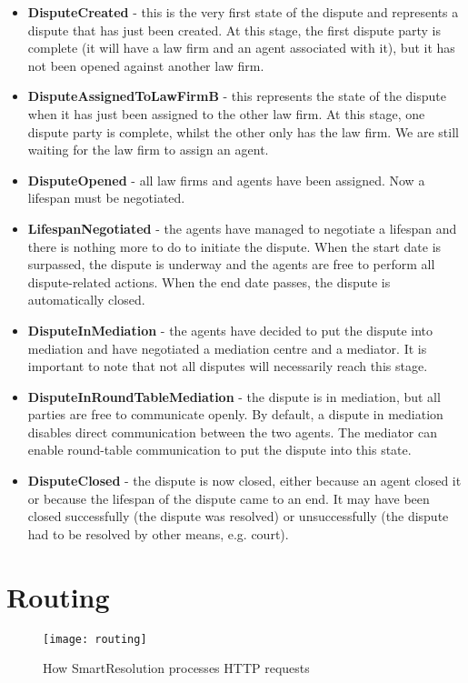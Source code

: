 \begin{itemize}
    \item \textbf{DisputeCreated} - this is the very first state of the dispute and represents a dispute that has just been created. At this stage, the first dispute party is complete (it will have a law firm and an agent associated with it), but it has not been opened against another law firm.
    \item \textbf{DisputeAssignedToLawFirmB} - this represents the state of the dispute when it has just been assigned to the other law firm. At this stage, one dispute party is complete, whilst the other only has the law firm. We are still waiting for the law firm to assign an agent.
    \item \textbf{DisputeOpened} - all law firms and agents have been assigned. Now a lifespan must be negotiated.
    \item \textbf{LifespanNegotiated} - the agents have managed to negotiate a lifespan and there is nothing more to do to initiate the dispute. When the start date is surpassed, the dispute is underway and the agents are free to perform all dispute-related actions. When the end date passes, the dispute is automatically closed.
    \item \textbf{DisputeInMediation} - the agents have decided to put the dispute into mediation and have negotiated a mediation centre and a mediator. It is important to note that not all disputes will necessarily reach this stage.
    \item \textbf{DisputeInRoundTableMediation} - the dispute is in mediation, but all parties are free to communicate openly. By default, a dispute in mediation disables direct communication between the two agents. The mediator can enable round-table communication to put the dispute into this state.
    \item \textbf{DisputeClosed} - the dispute is now closed, either because an agent closed it or because the lifespan of the dispute came to an end. It may have been closed successfully (the dispute was resolved) or unsuccessfully (the dispute had to be resolved by other means, e.g. court).
\end{itemize}

\section{Routing}

\begin{figure}[h!]
  \centering
    \ifimages
    \texttt{[image: routing]}
    \fi
  \caption{How SmartResolution processes HTTP requests}
  \label{uml:routing}
\end{figure}

